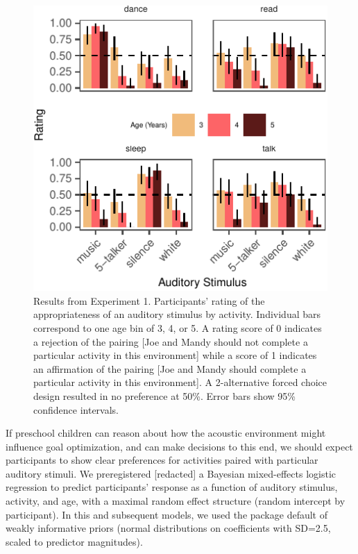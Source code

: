 \documentclass[10pt, letterpaper]{article}
\newenvironment{CodeChunk}{}{}
\begin{document}
\begin{CodeChunk}
\begin{figure}[t]

{\centering \includegraphics{figs/e3b-bar-1} 

}

\caption[Results from Experiment 1]{Results from Experiment 1. Participants' rating of the appropriateness of an auditory stimulus by activity. Individual bars correspond to one age bin of 3, 4, or 5. A rating score of 0 indicates a rejection of the pairing [Joe and Mandy should not complete a particular activity in this environment] while a score of 1 indicates an affirmation of the pairing [Joe and Mandy should complete a particular activity in this environment]. A 2-alternative forced choice design resulted in no preference at 50\%.  Error bars show 95\% confidence intervals.}\label{fig:e3b-bar}
\end{figure}
\end{CodeChunk}

If preschool children can reason about how the acoustic environment
might influence goal optimization, and can make decisions to this end,
we should expect participants to show clear preferences for activities
paired with particular auditory stimuli. We preregistered {[}redacted{]}
a Bayesian mixed-effects logistic regression to predict participants'
response as a function of auditory stimulus, activity, and age, with a
maximal random effect structure (random intercept by participant). In
this and subsequent models, we used the package default of weakly
informative priors (normal distributions on coefficients with SD=2.5,
scaled to predictor magnitudes).
\end{document}
